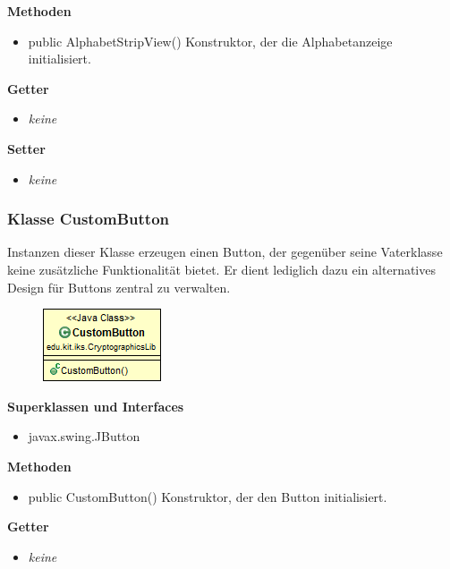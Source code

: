 \documentclass{article}
\begin{document}
      \textbf{Methoden}
      \begin{itemize}
        \item public AlphabetStripView() \newline
          Konstruktor, der die Alphabetanzeige initialisiert.
      \end{itemize}
      
      \textbf{Getter}
      \begin{itemize}
		\item \textit{keine}
      \end{itemize}
      
      \textbf{Setter}
      \begin{itemize}
        \item \textit{keine}
      \end{itemize}
	
	\subsubsection{Klasse CustomButton}
	  Instanzen dieser Klasse erzeugen einen Button, der gegenüber seine Vaterklasse keine zusätzliche Funktionalität bietet. Er dient lediglich dazu ein alternatives Design für Buttons zentral zu verwalten.
	
      \begin{figure}[H]
        \centering
        \includegraphics{resources/edu-kit-iks-CryptographicsLib-CustomButton}
      \end{figure}
	
      \textbf{Superklassen und Interfaces}
      \begin{itemize}
        \item javax.swing.JButton
      \end{itemize}
	
      \textbf{Methoden}
      \begin{itemize}
        \item public CustomButton() \newline
          Konstruktor, der den Button initialisiert.
      \end{itemize}
      
      \textbf{Getter}
      \begin{itemize}
		\item \textit{keine}
      \end{itemize}
      
\end{document}
